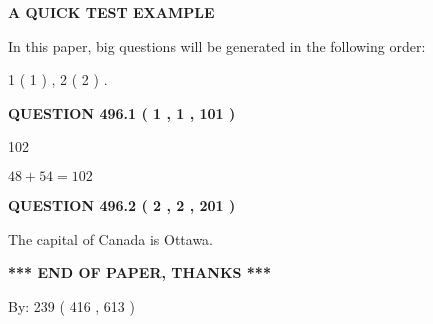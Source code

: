 \documentclass[12pt]{article}
\begin{document}
   
   
   
   
   
 \vspace{0.2in}
{\LARGE {\textbf{ A QUICK TEST EXAMPLE}}}
   
   
   
\vspace{0.2in}
   
In this paper, big questions will be generated in the following order: 
   
   
   1 ( 1 )
 ,
   2 ( 2 )
 .
  
\vspace{0.2in}
  
{\textbf{\Large{QUESTION
496.1 
 ( 1 , 1 , 101 )
}}}
  
  
 
 
\noindent{}

102
 
 
 
 
\noindent{}

$ %
48 +  %
54=   %
102$
 
 
  
\vspace{0.2in}
  
{\textbf{\Large{QUESTION
496.2 
 ( 2 , 2 , 201 )
}}}
  
  
 
 
\noindent{}
 
 
The capital of Canada is Ottawa.
 
 
 
 
   
   
 \vspace{0.2in}
 
   
   
   
   
\vspace{1.0in} 
{\textbf{\large{ *** END OF PAPER, THANKS *** }}} 
   
   
\hspace{1.0in} By: 
 239 ( 416 ,  613 )
   
   
   
   
\newpage 
\setcounter{page}{ 
   497001 } 
   
\end{document}
